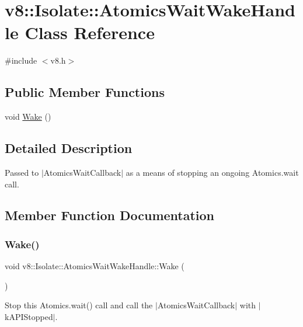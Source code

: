 \hypertarget{classv8_1_1Isolate_1_1AtomicsWaitWakeHandle}{}\section{v8\+:\+:Isolate\+:\+:Atomics\+Wait\+Wake\+Handle Class Reference}
\label{classv8_1_1Isolate_1_1AtomicsWaitWakeHandle}


{\ttfamily \#include $<$v8.\+h$>$}

\subsection*{Public Member Functions}
\begin{DoxyCompactItemize}
\item 
void \mbox{\hyperlink{classv8_1_1Isolate_1_1AtomicsWaitWakeHandle_a3d31d451537b6eee01e71360f7e66c2e}{Wake}} ()
\end{DoxyCompactItemize}


\subsection{Detailed Description}
Passed to $\vert$\+Atomics\+Wait\+Callback$\vert$ as a means of stopping an ongoing {\ttfamily Atomics.\+wait} call. 

\subsection{Member Function Documentation}
\mbox{\label{classv8_1_1Isolate_1_1AtomicsWaitWakeHandle_a3d31d451537b6eee01e71360f7e66c2e}} 
\subsubsection{\texorpdfstring{Wake()}{Wake()}}
{\footnotesize\ttfamily void v8\+::\+Isolate\+::\+Atomics\+Wait\+Wake\+Handle\+::\+Wake (\begin{DoxyParamCaption}{ }\end{DoxyParamCaption})}

Stop this {\ttfamily Atomics.\+wait()} call and call the $\vert$\+Atomics\+Wait\+Callback$\vert$ with $\vert$k\+A\+P\+I\+Stopped$\vert$.


